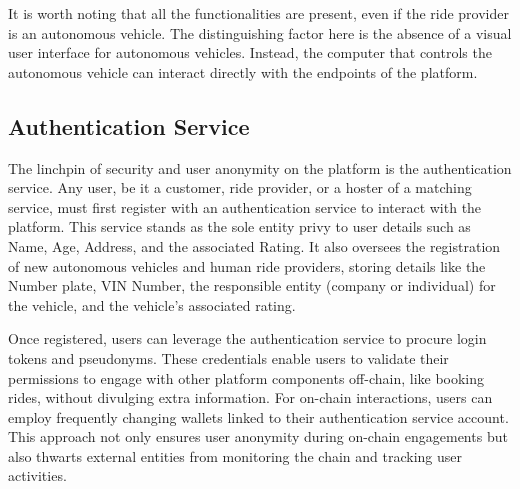 It is worth noting that all the functionalities are present, even if the ride provider is an autonomous vehicle. The distinguishing factor here is the absence of a visual user interface for autonomous vehicles. Instead, the computer that controls the autonomous vehicle can interact directly with the endpoints of the platform.

\subsection{Authentication Service}\label{subsec:AuthService}

The linchpin of security and user anonymity on the platform is the authentication service. Any user, be it a customer, ride provider, or a hoster of a matching service, must first register with an authentication service to interact with the platform. This service stands as the sole entity privy to user details such as Name, Age, Address, and the associated Rating. It also oversees the registration of new autonomous vehicles and human ride providers, storing details like the Number plate, VIN Number, the responsible entity (company or individual) for the vehicle, and the vehicle's associated rating.

Once registered, users can leverage the authentication service to procure login tokens and pseudonyms. These credentials enable users to validate their permissions to engage with other platform components off-chain, like booking rides, without divulging extra information. For on-chain interactions, users can employ frequently changing wallets linked to their authentication service account. This approach not only ensures user anonymity during on-chain engagements but also thwarts external entities from monitoring the chain and tracking user activities.

